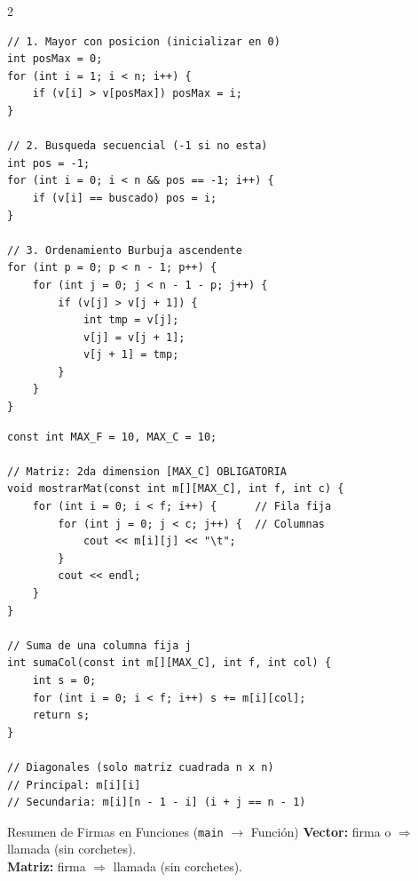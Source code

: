 \documentclass[10pt,letterpaper]{article}
\begin{document}
\vspace{-4pt}
\begin{multicols}{2}
\begin{lstlisting}[style=cppmonitoria, caption={Patrones 1D: Máximo, Búsqueda y Burbuja}]
// 1. Mayor con posicion (inicializar en 0)
int posMax = 0;
for (int i = 1; i < n; i++) {
    if (v[i] > v[posMax]) posMax = i;
}

// 2. Busqueda secuencial (-1 si no esta)
int pos = -1;
for (int i = 0; i < n && pos == -1; i++) {
    if (v[i] == buscado) pos = i;
}

// 3. Ordenamiento Burbuja ascendente
for (int p = 0; p < n - 1; p++) {
    for (int j = 0; j < n - 1 - p; j++) {
        if (v[j] > v[j + 1]) {
            int tmp = v[j];
            v[j] = v[j + 1];
            v[j + 1] = tmp;
        }
    }
}
\end{lstlisting}

\columnbreak

\begin{lstlisting}[style=cppmonitoria, caption={Patrones 2D y Paso a Funciones}]
const int MAX_F = 10, MAX_C = 10;

// Matriz: 2da dimension [MAX_C] OBLIGATORIA
void mostrarMat(const int m[][MAX_C], int f, int c) {
    for (int i = 0; i < f; i++) {      // Fila fija
        for (int j = 0; j < c; j++) {  // Columnas
            cout << m[i][j] << "\t";
        }
        cout << endl;
    }
}

// Suma de una columna fija j
int sumaCol(const int m[][MAX_C], int f, int col) {
    int s = 0;
    for (int i = 0; i < f; i++) s += m[i][col];
    return s;
}

// Diagonales (solo matriz cuadrada n x n)
// Principal: m[i][i]
// Secundaria: m[i][n - 1 - i] (i + j == n - 1)
\end{lstlisting}
\end{multicols}

\vspace{-6pt}
\begin{consejo}{Resumen de Firmas en Funciones (\texttt{main} $\rightarrow$ Función)}
\scriptsize
\textbf{Vector:} firma  o  $\Rightarrow$ llamada  (sin corchetes).\\
\textbf{Matriz:} firma  $\Rightarrow$ llamada  (sin corchetes).
\end{consejo}
\end{document}
